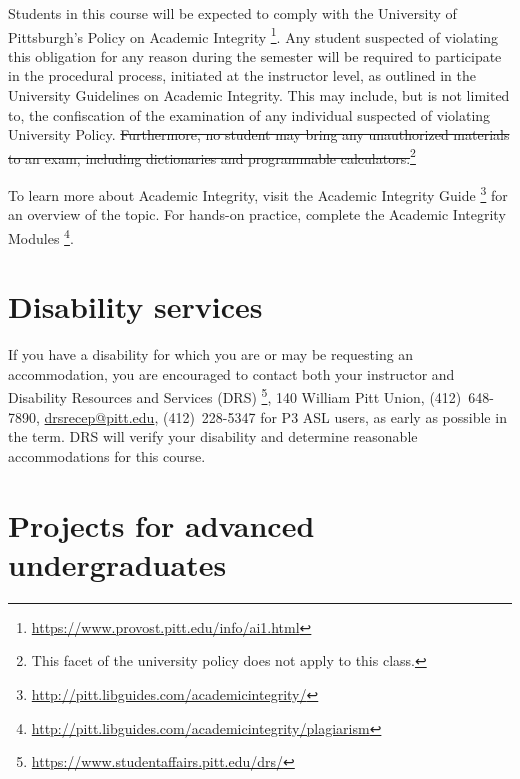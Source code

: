 \documentclass[12pt]{article}
\begin{document}
Students in this course %
will be expected to comply with %
the University of Pittsburgh's %
Policy on Academic Integrity%
\footnote{\url{https://www.provost.pitt.edu/info/ai1.html}}.
%
Any student suspected of violating this obligation %
for any reason during the semester %
will be required to participate in the procedural process, %
initiated at the instructor level, %
as outlined in the University Guidelines on Academic Integrity.
%
This may include, %
but is not limited to, %
the confiscation of the examination %
of any individual suspected of violating University Policy.
%
\st{Furthermore, %
no student may bring any unauthorized materials to an exam, %
including dictionaries and programmable calculators.}\footnote{%
This facet of the university policy does not apply to this class.}

To learn more about Academic Integrity, %
visit the Academic Integrity Guide%
\footnote{\url{http://pitt.libguides.com/academicintegrity/}} %
for an overview of the topic.
%
For hands-on practice, %
complete the Academic Integrity Modules%
\footnote{\url{http://pitt.libguides.com/academicintegrity/plagiarism}}.

\section{Disability services}

If you have a disability %
for which you are or may be requesting an accommodation, %
you are encouraged to contact %
both your instructor and Disability Resources and Services (DRS)%
\footnote{\url{https://www.studentaffairs.pitt.edu/drs/}}, %
140 William Pitt Union, %
(412)~648-7890, %
\href{mailto:drsrecep@pitt.edu}{drsrecep@pitt.edu}, %
(412)~228-5347 for P3 ASL users, %
as early as possible in the term.
%
DRS will verify your disability %
and determine reasonable accommodations for this course.

\label{mylastpage}              %
\newpage
\appendix
\setcounter{page}{1}
\renewcommand{\thepage}{\arabic{page}}
\fancyhead[r]{Appendix Page \thepage{} of~\pageref*{mylastappendixpage}}

\section{Projects for advanced undergraduates}
\label{sec:projects}



\printbibliography[heading=none]{}%
\label{mylastappendixpage}
\end{document}
